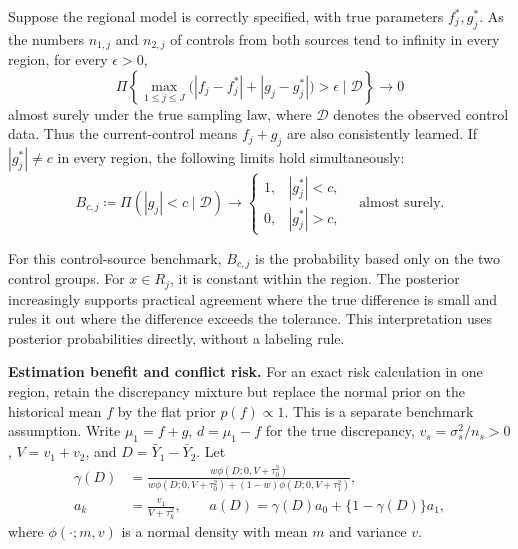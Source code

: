\begin{theorem}\label{thm:regional_learning}
Suppose the regional model is correctly specified, with true parameters $f_j^*,g_j^*$. As the numbers $n_{1,j}$ and $n_{2,j}$ of controls from both sources tend to infinity in every region, for every $\epsilon>0$,
\[
\Pi\left\{\max_{1\leq j\leq J}
\bigl(|f_j-f_j^*|+|g_j-g_j^*|\bigr)>\epsilon\mid\mathcal D\right\}\longrightarrow0
\]
almost surely under the true sampling law, where $\mathcal D$ denotes the observed control data. Thus the current-control means $f_j+g_j$ are also consistently learned. If $|g_j^*|\ne c$ in every region, the following limits hold simultaneously:
\begin{equation}\label{eq:regional_agreement}
B_{c,j}\coloneqq\Pi(|g_j|<c\mid\mathcal D)
\longrightarrow
\begin{cases}
1,& |g_j^*|<c,\\
0,& |g_j^*|>c,
\end{cases}
\quad\text{almost surely}.
\end{equation}
\end{theorem}
For this control-source benchmark, $B_{c,j}$ is the probability based only on the two control groups. For $x\in R_j$, it is constant within the region. The posterior increasingly supports practical agreement where the true difference is small and rules it out where the difference exceeds the tolerance. This interpretation uses posterior probabilities directly, without a labeling rule.

\noindent\textbf{Estimation benefit and conflict risk.}
For an exact risk calculation in one region, retain the discrepancy mixture but replace the normal prior on the historical mean $f$ by the flat prior $p(f)\propto1$. This is a separate benchmark assumption. Write $\mu_1=f+g$, $d=\mu_1-f$ for the true discrepancy, $v_s=\sigma_s^2/n_s>0$, $V=v_1+v_2$, and $D=\bar Y_1-\bar Y_2$. Let
\begin{equation}\label{eq:regional_weight}
\begin{aligned}
\gamma(D)&=\frac{w\phi(D;0,V+\tau_0^2)}
{w\phi(D;0,V+\tau_0^2)+(1-w)\phi(D;0,V+\tau_1^2)},\\
a_k&=\frac{v_1}{V+\tau_k^2},\qquad
a(D)=\gamma(D)a_0+\{1-\gamma(D)\}a_1,
\end{aligned}
\end{equation}
where $\phi(\cdot;m,v)$ is a normal density with mean $m$ and variance $v$.

